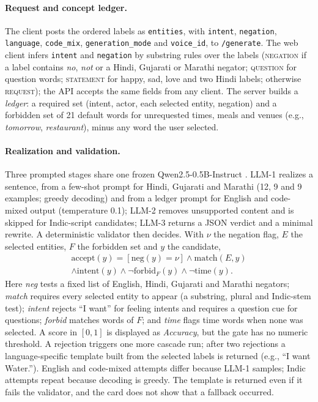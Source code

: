 \paragraph{Request and concept ledger.}
The client posts the ordered labels as \texttt{entities}, with \texttt{intent}, \texttt{negation}, \texttt{language}, \texttt{code\_mix}, \texttt{generation\_mode} and \texttt{voice\_id}, to \texttt{/generate}.
The web client infers \texttt{intent} and \texttt{negation} by substring rules over the labels (\textsc{negation} if a label contains \emph{no}, \emph{not} or a Hindi, Gujarati or Marathi negator; \textsc{question} for question words; \textsc{statement} for happy, sad, love and two Hindi labels; otherwise \textsc{request}); the API accepts the same fields from any client.
The server builds a \emph{ledger}: a required set (intent, actor, each selected entity, negation) and a forbidden set of 21 default words for unrequested times, meals and venues (e.g., \emph{tomorrow}, \emph{restaurant}), minus any word the user selected.

\paragraph{Realization and validation.}
Three prompted stages share one frozen Qwen2.5-0.5B-Instruct \citep{qwen2025qwen25}. LLM-1 realizes a sentence, from a few-shot prompt for Hindi, Gujarati and Marathi (12, 9 and 9 examples; greedy decoding) and from a ledger prompt for English and code-mixed output (temperature 0.1); LLM-2 removes unsupported content and is skipped for Indic-script candidates; LLM-3 returns a JSON verdict and a minimal rewrite.
A deterministic validator then decides. With $\nu$ the negation flag, $E$ the selected entities, $F$ the forbidden set and $y$ the candidate,
\begin{multline}
\mathrm{accept}(y)=[\mathrm{neg}(y)=\nu]\wedge\mathrm{match}(E,y)\\
\wedge\mathrm{intent}(y)\wedge\neg\mathrm{forbid}_F(y)\wedge\neg\mathrm{time}(y).
\label{eq:gate}
\end{multline}
Here \emph{neg} tests a fixed list of English, Hindi, Gujarati and Marathi negators; \emph{match} requires every selected entity to appear (a substring, plural and Indic-stem test); \emph{intent} rejects ``I want'' for feeling intents and requires a question cue for questions; \emph{forbid} matches words of $F$; and \emph{time} flags time words when none was selected.
A score in $[0,1]$ is displayed as \emph{Accuracy}, but the gate has no numeric threshold.
A rejection triggers one more cascade run; after two rejections a language-specific template built from the selected labels is returned (e.g., ``I want Water.'').
English and code-mixed attempts differ because LLM-1 samples; Indic attempts repeat because decoding is greedy.
The template is returned even if it fails the validator, and the card does not show that a fallback occurred.

